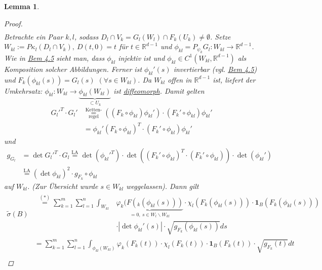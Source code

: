 \documentclass[a4paper]{report}
\newcommand{\doubleOne}{\textbf{1}}
\newcommand{\R}{\mathbb{R}}
\newcommand{\overunderset}[3]{\overset{#1}{\underset{#3}{#2}}}
\newcommand{\jhyperref}[2]{\hyperref[j_#1]{#2}}
\newcommand{\jlink}[1]{\jhyperref{#1}{#1}}
\newcommand{\jabb}[3]{ #1: #2 \rightarrow #3 }
\theoremstyle{plain}
\newtheorem{lem}[thm]{Lemma}
\theoremstyle{definition}
\begin{document}
{{{{\begin{lem}
\begin{proof}
\[\begin{split}
            \end{split}
        \]
        Betrachte ein Paar $k,l$, sodass $D_l\cap V_k = G_l(W_l)\cap F_k(U_k) \ne \emptyset$. Setze $W_{kl}:= P\kappa_l(D_l\cap V_k), \ D(t,0) = t$ für $t\in\R^{d-1}$ und $\phi_{kl} = \jabb{P_{\psi_k}G_l}{W_{kl}}{\R^{d-1}}$. Wie in \jlink{Bem 4.5} sieht man, dass $\phi_{kl}$ injektiv ist und $\phi_{kl}\in C^1(W_{kl}, \R^{d-1})$ als Komposition solcher Abbildungen. Ferner ist $\phi_{kl}'(s)$ invertierbar (vgl. \jlink{Bem 4.5}) und $F_k(\phi_{kl}(s)) = G_l(s)$ $(\forall s \in W_{kl})$. Da $W_{kl}$ offen in $\R^{d-1}$ ist, liefert der Umkehrsatz: $\jabb{\phi_{kl}}{W_{kl}}{\underbrace{\phi_{kl}(W_{kl})}_{\subset U_k}}$ ist \jlink{diffeomorph}. Damit gelten
        \[
            \begin{split}
                G_l'^T \cdot G_l' &\overunderset{\text{Ketten-}}{=}{\text{regel}} \left((F_k \circ \phi_{kl}) \phi_{kl}' \right) \cdot (F_k' \circ \phi_{kl}) \phi_{kl}'\\
                                  &=\phi_{kl}' (F_k\circ \phi_{kl})^T\cdot (F_k' \circ \phi_{kl}) \phi_{kl}'
            \end{split}
        \]
        und
        \[
            \begin{split}
                g_{G_l} &= \det G_l'^T \cdot G_l \overset{\text{LA}}{=} \det (\phi_{kl}'^T)\cdot \det \left((F_k' \circ \phi_{kl})^T \cdot (F_k' \circ \phi_{kl}) \right) \cdot \det(\phi_{kl}')\\
                        &\overset{\text{LA}}{=} \left(\det \phi_{kl} \right)^2 \cdot g_{F_k}\circ \phi_{kl}
            \end{split}
        \]
        auf $W_{kl}$. (Zur Übersicht wurde $s\in W_{kl}$ weggelassen). Dann gilt
        \[
            \begin{split}
                \tilde{\sigma}(B)
                &\begin{split}
                    \overset{(*)}{=}\sum_{k=1}^m \sum_{l=1}^n \int_{W_{kl}}&\underbrace{\varphi_k(F(_k(\phi_{kl}(s)))}_{=0,\ s\in W_l\backslash W_{kl}} \cdot \chi_l(F_k(\phi_{kl}(s))) \cdot \doubleOne_B(F_k(\phi_{kl}(s)))\\
                &\cdot |\det \phi_{kl}'(s)| \cdot \sqrt{g_{F_k}(\phi_{kl}(s))} ds 
                \end{split}\\
                &= \sum_{k=1}^m \sum_{l=1}^n \int_{\phi_{kl}(W_{kl})} \varphi_k(F_k(t)) \cdot \chi_l(F_k(t)) \cdot \doubleOne_B(F_k(t)) \cdot \sqrt{g_{F_k}(t)} dt\\

\end{split}\]
\end{proof}
\end{lem}}}}}
\end{document}
